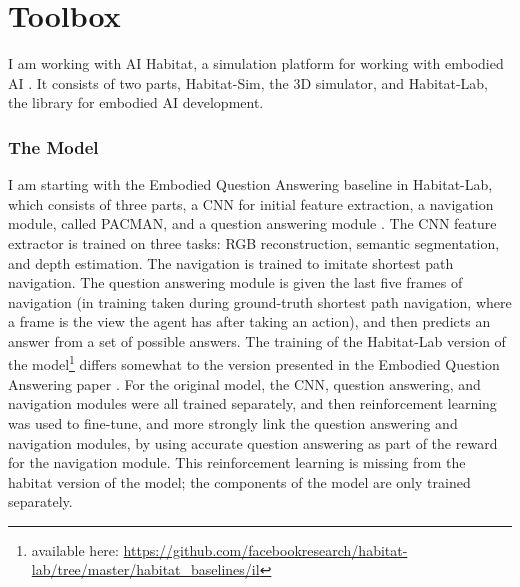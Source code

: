 \chapter{Toolbox}
I am working with AI Habitat, a simulation platform for working with embodied AI \cite{habitat19iccv}. It consists of two parts, Habitat-Sim, the 3D simulator, and Habitat-Lab, the library for embodied AI development. 

\subsection{The Model}
\label{subsection:model}
I am starting with the Embodied Question Answering baseline in Habitat-Lab, which consists of three parts, a CNN for initial feature extraction, a navigation module, called PACMAN, and a question answering module \cite{embodiedqa}.
The CNN feature extractor is trained on three tasks: RGB reconstruction, semantic segmentation, and depth estimation.
The navigation is trained to imitate shortest path navigation. %
The question answering module is given the last five frames of navigation (in training taken during ground-truth shortest path navigation, where a frame is the view the agent has after taking an action), and then predicts an answer from a set of possible answers. 
The training of the Habitat-Lab version of the model\footnote{available here: \url{https://github.com/facebookresearch/habitat-lab/tree/master/habitat_baselines/il}} differs somewhat to the version presented in the Embodied Question Answering paper \cite{embodiedqa}. For the original model, the CNN, question answering, and navigation modules were all trained separately, and then reinforcement learning was used to fine-tune, and more strongly link the question answering and navigation modules, by using accurate question answering %
as part of the reward for the navigation module. This reinforcement learning is missing from the habitat version of the model; the components of the model are only trained separately. 


